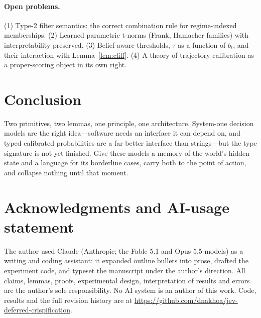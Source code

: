 \documentclass[11pt,a4paper]{article}
\numberwithin{equation}{section}
\theoremstyle{plain}
\theoremstyle{definition}
\theoremstyle{remark}
\begin{document}
\paragraph{Open problems.} (1) Type-2 filter semantics: the correct combination rule for regime-indexed memberships. (2) Learned parametric t-norms (Frank, Hamacher families) with interpretability preserved. (3) Belief-aware thresholds, $\tau$ as a function of $b_t$, and their interaction with Lemma~\ref{lem:cliff}. (4) A theory of trajectory calibration as a proper-scoring object in its own right.

\section{Conclusion}

Two primitives, two lemmas, one principle, one architecture. System-one decision models are the right idea---software needs an interface it can depend on, and typed calibrated probabilities are a far better interface than strings---but the type signature is not yet finished. Give these models a memory of the world's hidden state and a language for its borderline cases, carry both to the point of action, and collapse nothing until that moment.

\section*{Acknowledgments and AI-usage statement}
The author used Claude (Anthropic; the Fable 5.1 and Opus 5.5 models) as a writing and coding assistant: it expanded outline bullets into prose, drafted the experiment code, and typeset the manuscript under the author's direction. All claims, lemmas, proofs, experimental design, interpretation of results and errors are the author's sole responsibility. No AI system is an author of this work. Code, results and the full revision history are at \url{https://github.com/dnakhoa/jev-deferred-crispification}.
\end{document}
